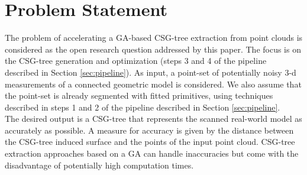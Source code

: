 \section{Problem Statement}
\label{sec:prob}
The problem of accelerating a \ac{GA}-based \ac{CSG}-tree extraction from point clouds is considered as the open research question addressed by this paper.
The focus is on the \ac{CSG}-tree generation and optimization (steps 3 and 4 of the pipeline described in Section \ref{sec:pipeline}).
As input, a point-set of potentially noisy $3$-d measurements of a connected geometric model is considered. We also assume that the point-set is already segmented with fitted primitives, using techniques described in steps 1 and 2 of the pipeline described in Section \ref{sec:pipeline}.
\\
The desired output is a \ac{CSG}-tree that represents the scanned real-world model as accurately as possible.
A measure for accuracy is given by the distance between the \ac{CSG}-tree induced surface and the points of the input point cloud.
\ac{CSG}-tree extraction approaches based on a \ac{GA} \cite{fayolle2016evolutionary} can handle 
inaccuracies but come with the disadvantage of potentially high computation times.
